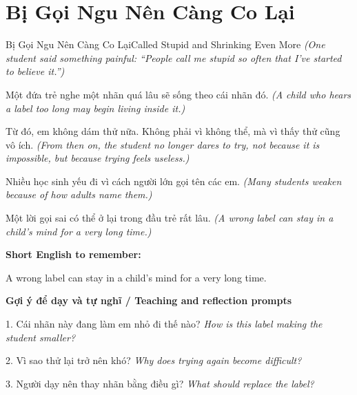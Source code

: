 \section{Bị Gọi Ngu Nên Càng Co Lại}
\begin{truyen}{Bị Gọi Ngu Nên Càng Co Lại}{Called Stupid and Shrinking Even More}
\textit{(One student said something painful: “People call me stupid so often that I’ve started to believe it.”)}

Một đứa trẻ nghe một nhãn quá lâu sẽ sống theo cái nhãn đó.
\textit{(A child who hears a label too long may begin living inside it.)}

Từ đó, em không dám thử nữa. Không phải vì không thể, mà vì thấy thử cũng vô ích.
\textit{(From then on, the student no longer dares to try, not because it is impossible, but because trying feels useless.)}

Nhiều học sinh yếu đi vì cách người lớn gọi tên các em.
\textit{(Many students weaken because of how adults name them.)}

\end{truyen}

\begin{baihoc}
Một lời gọi sai có thể ở lại trong đầu trẻ rất lâu.
\textit{(A wrong label can stay in a child’s mind for a very long time.)}
\end{baihoc}

\begin{ghinhoanh}
\textbf{Short English to remember:}

A wrong label can stay in a child’s mind for a very long time.

\end{ghinhoanh}

\begin{tuhocnhanh}
\textbf{Gợi ý để dạy và tự nghĩ / Teaching and reflection prompts}

1. Cái nhãn này đang làm em nhỏ đi thế nào? \textit{How is this label making the student smaller?}

2. Vì sao thử lại trở nên khó? \textit{Why does trying again become difficult?}

3. Người dạy nên thay nhãn bằng điều gì? \textit{What should replace the label?}
\end{tuhocnhanh}
\ngancach

